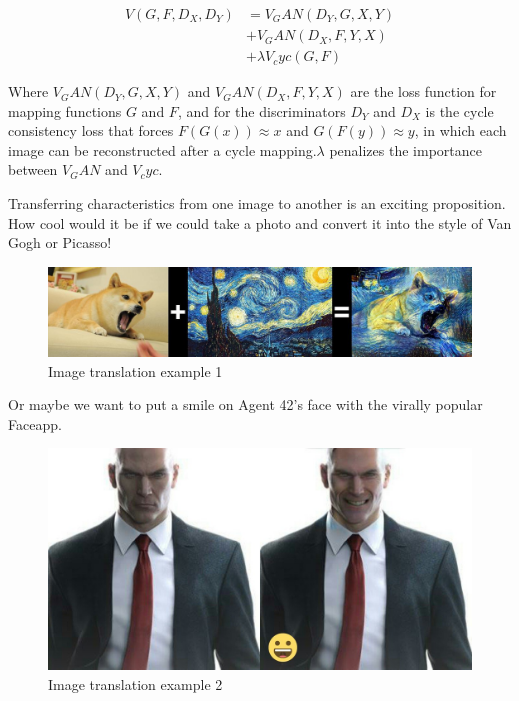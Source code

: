 \documentclass[peerreview]{IEEEtran}
\begin{document}
\begin{equation}
    \begin{split}
         V(G, F, D_X, D_Y) & = V_GAN(D_Y, G, X, Y) \\
         & + V_GAN(D_X, F, Y, X) \\
         & + \lambda V_cyc(G, F)
    \end{split}
\end{equation}

Where $V_GAN(D_Y, G, X, Y)$ and $V_GAN(D_X, F, Y, X)$ are the loss function for mapping functions $G$ and $F$, and for the discriminators $D_Y$ and $D_X$ is the cycle consistency loss that forces $F(G(x)) \approx x$ and $G(F(y)) \approx y$, in which each image can be reconstructed after a cycle mapping.$\lambda$ penalizes the importance between $V_GAN$ and $V_cyc$.

Transferring characteristics from one image to another is an exciting proposition. How cool would it be if we could take a photo and convert it into the style of Van Gogh or Picasso!

\begin{figure}[H]
    \centering
    \includegraphics[width=0.8\columnwidth]{doge_starrynight}
    \caption{Image translation example 1}
    \label{fig:s=doge_starry}
\end{figure}

Or maybe we want to put a smile on Agent 42's face with the virally popular Faceapp.

\begin{figure}[H]
    \centering
    \includegraphics[width=0.8\columnwidth]{agent47}
    \caption{Image translation example 2}
    \label{fig:s=agent47}
\end{figure}
\end{document}
